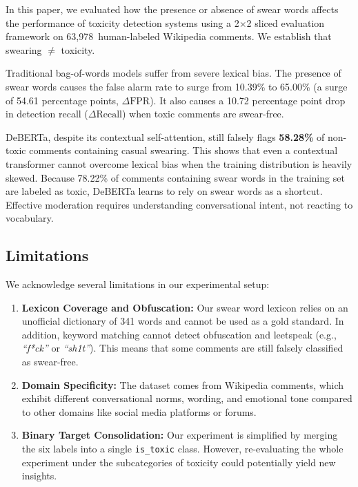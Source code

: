\documentclass[11pt]{article}
\begin{document}
In this paper, we evaluated how the presence or absence of swear
words affects the performance of toxicity detection systems using a
2$\times$2 sliced evaluation framework on 63,978~human-labeled
Wikipedia comments. We establish that swearing $\neq$ toxicity.

Traditional bag-of-words models suffer from severe lexical bias. The
presence of swear words causes the false alarm rate to surge from
10.39\% to 65.00\% (a surge of 54.61 percentage points, $\Delta\text{FPR}$).
It also causes a 10.72 percentage point drop in detection recall
($\Delta\text{Recall}$) when toxic comments are swear-free.

DeBERTa, despite its contextual self-attention, still falsely flags
\textbf{58.28\%} of non-toxic comments containing casual swearing.
This shows that even a contextual transformer cannot overcome lexical
bias when the training distribution is heavily skewed. Because 78.22\%
of comments containing swear words in the training set are
labeled as toxic, DeBERTa learns to rely on swear words as a
shortcut. Effective moderation requires understanding conversational
intent, not reacting to vocabulary.

\subsection{Limitations}

We acknowledge several limitations in our experimental setup:

\begin{enumerate}\setlength{\itemsep}{1pt}\setlength{\parskip}{0pt}
  \item \textbf{Lexicon Coverage and Obfuscation:} Our swear word
    lexicon relies on an unofficial dictionary of 341 words and
    cannot be used as a gold standard. In addition, keyword matching
    cannot detect obfuscation and leetspeak (e.g., \textit{``f*ck''}
    or \textit{``sh1t''}). This means that some comments are
    still falsely classified as swear-free.

  \item \textbf{Domain Specificity:} The dataset comes from Wikipedia
    comments, which exhibit different conversational norms, wording,
    and emotional tone compared to other domains like social media
    platforms or forums.

  \item \textbf{Binary Target Consolidation:} Our experiment is
    simplified by merging the six labels into a single
    \texttt{is\_toxic} class. However, re-evaluating the whole
    experiment under the subcategories of toxicity could potentially
    yield new insights.
\end{enumerate}
\end{document}
